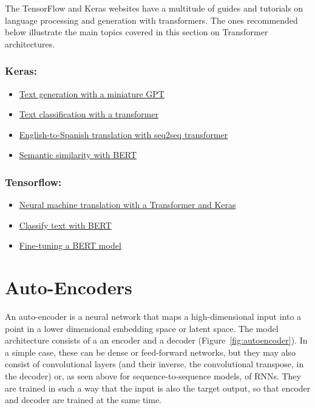 \begin{withcode}
\begin{resourcebox}
The TensorFlow and Keras websites have a multitude of guides and tutorials on language processing and generation with transformers. The ones recommended below illustrate the main topics covered in this section on Transformer architectures.

\subsubsection*{Keras:}
\begin{itemize}
\item \href{https://keras.io/examples/generative/text_generation_with_miniature_gpt/}{Text generation with a miniature GPT} 
\item \href{https://keras.io/examples/nlp/text_classification_with_transformer/}{Text classification with a transformer} 
\item \href{https://keras.io/examples/nlp/neural_machine_translation_with_transformer/}{English-to-Spanish translation with seq2seq transformer} 
\item \href{https://keras.io/examples/nlp/semantic_similarity_with_bert/}{Semantic similarity with BERT} 
\end{itemize}

\subsubsection*{Tensorflow:}
\begin{itemize}
\item \href{https://www.tensorflow.org/text/tutorials/transformer}{Neural machine translation with a Transformer and Keras} 
\item \href{https://www.tensorflow.org/text/tutorials/classify_text_with_bert}{Classify text with BERT} 
\item \href{https://www.tensorflow.org/tfmodels/nlp/fine_tune_bert}{Fine-tuning a BERT model} 
\end{itemize}
\end{resourcebox}
\end{withcode}

\section{Auto-Encoders}

An auto-encoder is a neural network that maps a high-dimensional input into a point in a lower dimensional embedding space or latent space. The model architecture consists of a an encoder and a decoder (Figure~\ref{fig:autoencoder}). In a simple case, these can be dense or feed-forward networks, but they may also consist of convolutional layers (and their inverse, the convolutional transpose, in the decoder) or, as seen above for sequence-to-sequence models, of RNNs. They are trained in such a way that the input is also the target output, so that encoder and decoder are trained at the same time.

